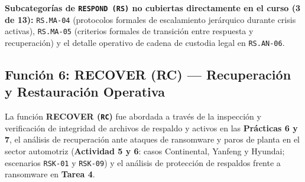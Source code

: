 \documentclass[letterpaper,11pt]{article}
\begin{document}
\noindent\textbf{Subcategorías de \texttt{RESPOND (RS)} no cubiertas directamente en el curso (3 de 13):} \texttt{RS.MA-04} (protocolos formales de escalamiento jerárquico durante crisis activas), \texttt{RS.MA-05} (criterios formales de transición entre respuesta y recuperación) y el detalle operativo de cadena de custodia legal en \texttt{RS.AN-06}.

\subsection{Función 6: RECOVER (RC) --- Recuperación y Restauración Operativa}

La función \textbf{RECOVER (\texttt{RC})} fue abordada a través de la inspección y verificación de integridad de archivos de respaldo y activos en las \textbf{Prácticas 6 y 7}, el análisis de recuperación ante ataques de ransomware y paros de planta en el sector automotriz (\textbf{Actividad 5 y 6}: casos Continental, Yanfeng y Hyundai; escenarios \texttt{RSK-01} y \texttt{RSK-09}) y el análisis de protección de respaldos frente a ransomware en \textbf{Tarea 4}.
\end{document}
